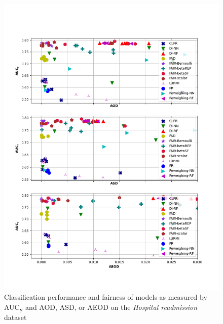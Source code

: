 \documentclass[preprint,12pt]{elsarticle}
\begin{document}
\begin{figure}
	\center
	\includegraphics[angle=0, width=1\textwidth]{Readmission_all.png}
	\captionsetup{justification=centering}
	\caption{Classification performance and fairness of models as measured by AUC$_\mathbf{y}$ and AOD, ASD, or AEOD on the \textit{Hospital readmission} dataset}
	\label{fig:Readmission all}
	\vskip -0.2in
\end{figure}
\end{document}
